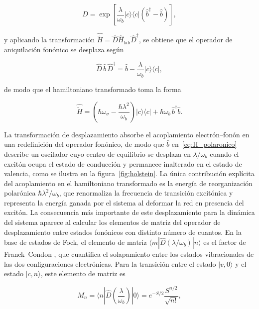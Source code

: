 \begin{equation}
	\hat{D} = \exp\!\left[\frac{\lambda}{\omega_b}
	|c\rangle\langle c|\left(\hat{b}^\dagger - \hat{b}\right)\right],
	\label{eq:D_op}
\end{equation}

y aplicando la transformación $\hat{\tilde{H}} = \hat{D}\hat{H}_\text{lab} \hat{D}^\dagger$, se obtiene que el operador de aniquilación fonónico se desplaza según

\begin{equation}
	\hat{D}\,\hat{b}\,\hat{D}^\dagger = \hat{b} -
	\frac{\lambda}{\omega_b}|c\rangle\langle c|,
	\label{eq:b_desplazado}
\end{equation}

de modo que el hamiltoniano transformado toma la forma

\begin{equation}
	\hat{\tilde{H}} = \left(\hbar\omega_\sigma -
	\frac{\hbar\lambda^2}{\omega_b}\right)|c\rangle\langle c|
	+ \hbar\omega_b\,\hat{b}^\dagger\hat{b}.
	\label{eq:H_polaronico}
\end{equation}

La transformación de desplazamiento absorbe el acoplamiento electrón--fonón en una redefinición del operador fonónico, de modo que $\hat{b}$ en~\eqref{eq:H_polaronico} describe un oscilador cuyo centro de equilibrio se desplaza en $\lambda/\omega_b$ cuando el excitón ocupa el estado de conducción y permanece inalterado en el estado de valencia, como se ilustra en la figura~\ref{fig:holstein}. La única contribución explícita del acoplamiento en el hamiltoniano transformado es la energía de reorganización polarónica $\hbar\lambda^2/\omega_b$, que renormaliza la frecuencia de transición excitónica y representa la energía ganada por el sistema al deformar la red en presencia del excitón. La consecuencia más importante de este desplazamiento para la dinámica del sistema aparece al calcular los elementos de matriz del operador de desplazamiento entre estados fonónicos con distinto número de cuantos. En la base de estados de Fock, el elemento de matriz $\langle m|\hat{D}(\lambda/\omega_b)|n\rangle$ es el factor de Franck--Condon \cite{huang1950}, que cuantifica el solapamiento entre los estados vibracionales de las dos configuraciones electrónicas. Para la transición entre el estado $|v,0\rangle$ y el estado $|c,n\rangle$, este elemento de matriz es

\begin{equation}
	M_n = \langle n|\hat{D}\!\left(\frac{\lambda}{\omega_b}\right)|0\rangle
	= e^{-S/2}\frac{S^{n/2}}{\sqrt{n!}},
	\label{eq:franck_condon}
\end{equation}

